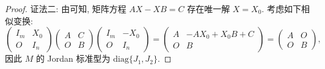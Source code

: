 \documentclass[../../main.tex]{subfiles}%
\begin{document}
\begin{proof}
{\color{blue}证法二:}
由可知, 矩阵方程 $AX - XB = C$ 存在唯一解 $X = X_0$. 考虑如下相似变换:
\[
\begin{pmatrix}I_m & X_0 \\ O & I_n\end{pmatrix}
\begin{pmatrix}A & C \\ O & B\end{pmatrix}
\begin{pmatrix}I_m & -X_0 \\ O & I_n\end{pmatrix}
=
\begin{pmatrix}A & -AX_0 + X_0B + C \\ O & B\end{pmatrix}
=
\begin{pmatrix}A & O \\ O & B\end{pmatrix},
\]
因此 $M$ 的 Jordan 标准型为 $\mathrm{diag}\{J_1,J_2\}$. 
\end{proof}
\end{document}
